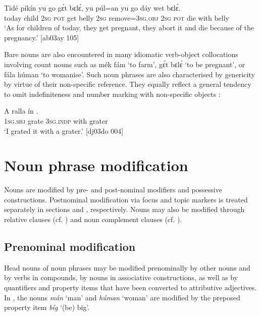 \ea%
    \label{ex:key:229}
    \gll Tidé  pikín  yu  go  gɛ́t  bɛlɛ́,    yu  púl=an
yu  go  dáy  wet    bɛlɛ́.\\
today  child  \textsc{2sg}  \textsc{pot}  get  belly  \textsc{2sg}  remove=\textsc{3sg.obj}
\textsc{2sg}  \textsc{pot}  die  with    belly\\

\glt ‘As for children of today, they get pregnant, they abort it and die because of the pregnancy.’ [ab03ay 105]
\z

Bare nouns are also encountered in many idiomatic verb-object collocations involving count nouns such as mék fám ‘to farm’, gɛ́t bɛlɛ́ ‘to be pregnant’, or fála húman ‘to womanise’. Such noun phrases are also characterised by genericity by virtue of their non-specific reference. They equally reflect a general tendency to omit indefiniteness and number marking with non-specific objects{\fff} : {\fff}


\ea%
    \label{ex:key:230}
    \gll \MakeUppercase{A}   ralla    ín        .\\
\textsc{1sg.sbj}  grate  \textsc{3sg.indp}  with    grater\\

\glt ‘I grated it with a grater.’ [dj03do 004]
\z

\section{Noun phrase modification}\label{sec:5.2}

Nouns are modified by pre- and post-nominal modifiers and possessive constructions. Postnominal modification via focus and topic markers is treated separately in sections  and , respectively. Nouns may also be modified through relative clauses (cf. ) and noun complement clauses (cf. ).

\subsection{Prenominal modification}\label{sec:5.2.1}

Head nouns of noun phrases may be modified prenominally by other nouns and by verbs in compounds, by nouns in associative constructions, as well as by quantifiers and property items that have been converted to attributive adjectives. In , the nouns \textit{mán} ‘man’ and \textit{húman} ‘woman’ are modified by the preposed property item \textit{bíg} ‘(be) big’. 



